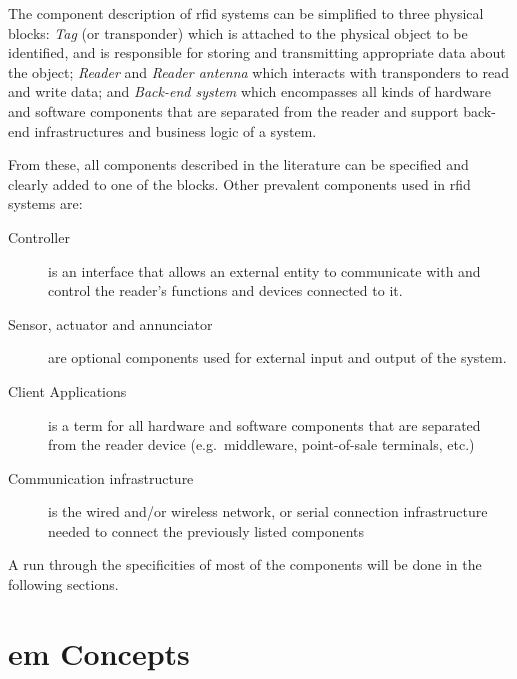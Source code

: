 The component description of \ac{rfid} systems can be simplified to three physical blocks: \emph{Tag} (or transponder) which is attached to the physical object to be identified, and is responsible for storing and transmitting appropriate data about the object; \emph{Reader} and \emph{Reader antenna} which interacts with transponders to read and write data; and \emph{Back-end system} which encompasses all kinds of hardware and software components that are separated from the reader and support back-end infrastructures and business logic of a system.

From these, all components described in the literature can be specified and clearly added to one of the blocks.
Other prevalent components used in \ac{rfid} systems are:

\begin{description}
    \item[Controller] is an interface that allows an external entity to communicate with and control the reader's functions and devices connected to it.
    \item[Sensor, actuator and annunciator] are optional components used for external input and output of the system.
    \item[Client Applications] is a term for all hardware and software components that are separated from the reader device (e.g.\ middleware, point-of-sale terminals, etc.)
    \item[Communication infrastructure] is the wired and/or wireless network, or serial connection infrastructure needed to connect the previously listed components
\end{description}


A run through the specificities of most of the components will be done in the following sections.

\section{\acl{em} Concepts} \label{sec:em}

